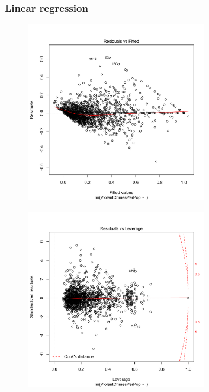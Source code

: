 \documentclass[12pt,a4paper]{article}
\begin{document}
\begin{singlespace}
\newpage
\subsubsection{Linear regression}
\vspace{-0.5cm}
\begin{figure}[h!]
    \centering
    \includegraphics[width=0.7\textwidth,trim= 0 0 20 30, clip]{Unk_linear_regression_residuals.pdf}
\end{figure}
\FloatBarrier

\vspace{-0.5cm}
\begin{figure}[h!]
    \centering
    \includegraphics[width=0.7\textwidth,trim= 0 0 20 30, clip]{Unk_linear_regression_cook.pdf}
\end{figure}
\FloatBarrier


\end{singlespace}
\end{document}
